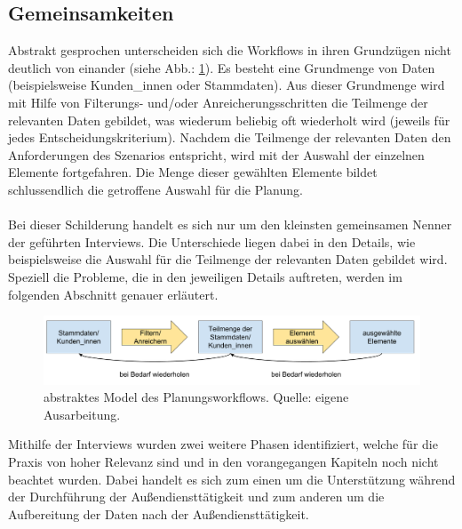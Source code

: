 \documentclass[Bachelorarbeit.tex]{subfiles}
\begin{document}
\subsection{Gemeinsamkeiten}
\label{subsubsec:Ergebnisse der Interviews:gemeinsamkeiten}
Abstrakt gesprochen unterscheiden sich die Workflows in ihren Grundzügen nicht deutlich von einander (siehe Abb.: \ref{fig:abstrakterWorkflowPlannung}). 
Es besteht eine Grundmenge von Daten (beispielsweise Kunden\_innen oder Stammdaten). 
Aus dieser Grundmenge wird mit Hilfe von Filterungs- und/oder Anreicherungsschritten die Teilmenge der relevanten Daten gebildet, was wiederum beliebig oft wiederholt wird (jeweils für jedes Entscheidungskriterium).
Nachdem die Teilmenge der relevanten Daten den Anforderungen des Szenarios entspricht, wird mit der Auswahl der einzelnen Elemente fortgefahren.
Die Menge dieser gewählten Elemente bildet schlussendlich die getroffene Auswahl für die Planung.\\
\\
Bei dieser Schilderung handelt es sich nur um den kleinsten gemeinsamen Nenner der geführten Interviews.
Die Unterschiede liegen dabei in den Details, wie beispielsweise die Auswahl für die Teilmenge der relevanten Daten gebildet wird.
Speziell die Probleme, die in den jeweiligen Details auftreten, werden im folgenden Abschnitt genauer erläutert.

\begin{figure}[h]
	\includegraphics[width=\linewidth]{img/analyse/abstrakterWorkflowPlannung}
	\caption[abstrakter Planungsworkflow]{abstraktes Model des Planungsworkflows. Quelle: eigene Ausarbeitung.}
	\label{fig:abstrakterWorkflowPlannung}
\end{figure}

Mithilfe der Interviews wurden zwei weitere Phasen identifiziert, welche für die Praxis von hoher Relevanz sind und in den vorangegangen Kapiteln noch nicht beachtet wurden.
Dabei handelt es sich zum einen um die Unterstützung während der Durchführung der Außendiensttätigkeit und zum anderen um die Aufbereitung der Daten nach der Außendiensttätigkeit.
\end{document}
